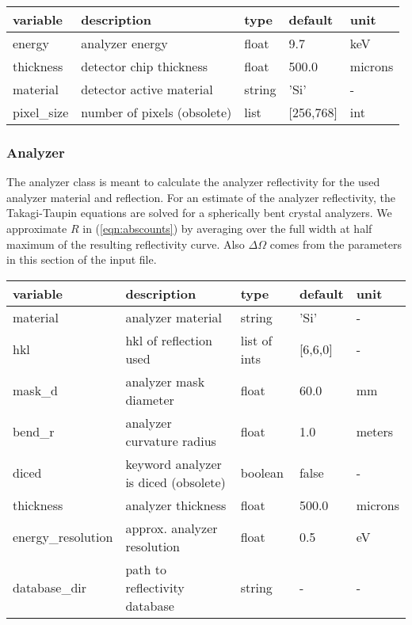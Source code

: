 \documentclass[aps,prl,groupedaddress]{revtex4}
\begin{document}
\begin{ruledtabular}
\begin{tabular}{lllll}
variable          & description                 & type   & default  & unit    \\
\hline
energy            & analyzer energy             & float  & 9.7      & keV     \\
thickness         & detector chip thickness     & float  & 500.0    & microns \\
material          & detector active material    & string & 'Si'     & -       \\
pixel\_size       & number of pixels (obsolete) & list   & [256,768]& int     \\
\end{tabular}
\end{ruledtabular}

\subsubsection{Analyzer}
The analyzer class is meant to calculate the analyzer reflectivity for the used analyzer material and reflection. For an estimate of the analyzer reflectivity, the Takagi-Taupin equations\cite{tagaki1962,taupin1964,Vartanyants1993} are solved for a spherically bent crystal analyzers. We approximate $R$ in (\ref{eqn:abscounts}) by averaging over the full width at half maximum of the resulting reflectivity curve. Also $\Delta\Omega$ comes from the parameters in this section of the input file.

\begin{ruledtabular}
\begin{tabular}{lllll}
variable            & description                          & type          & default  & unit    \\
\hline
material            & analyzer material                    & string        & 'Si'     & -       \\
hkl                 & hkl of reflection used               & list of ints  & [6,6,0]  & -       \\
mask\_d             & analyzer mask diameter               & float         & 60.0     & mm      \\
bend\_r             & analyzer curvature radius            & float         & 1.0      & meters  \\
diced               & keyword analyzer is diced (obsolete) & boolean       & false    & -       \\
thickness           & analyzer thickness                   & float         & 500.0    & microns \\
energy\_resolution  & approx. analyzer resolution          & float         & 0.5      & eV      \\
database\_dir       & path to reflectivity database        & string        & -        & -       \\
\end{tabular}
\end{ruledtabular}
\end{document}
